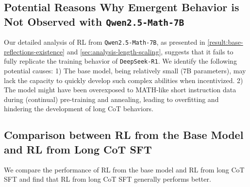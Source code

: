 
\subsection{Potential Reasons Why Emergent Behavior is Not Observed with \texttt{Qwen2.5-Math-7B}}

Our detailed analysis of RL from \texttt{Qwen2.5-Math-7B}, as presented in \textsection\ref{result:base-reflections-existence} and \textsection\ref{sec:analysis-length-scaling}, suggests that it fails to fully replicate the training behavior of \texttt{DeepSeek-R1}. We identify the following potential causes: 1) The base model, being relatively small (7B parameters), may lack the capacity to quickly develop such complex abilities when incentivized. 2) The model might have been overexposed to MATH-like short instruction data during (continual) pre-training and annealing, leading to overfitting and hindering the development of long CoT behaviors.

\subsection{Comparison between RL from the Base Model and RL from Long CoT SFT}
\label{sec:rl-from-base-vs-long-cot-sft}

We compare the performance of RL from the base model and RL from long CoT SFT and find that RL from long CoT SFT generally performs better.

